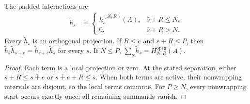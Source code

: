 \begin{lemma}
    \label{thm:open_knabe_padding_properties}
    \leanok
    The padded interactions are
    \begin{align}
        \widetilde h_s & =
        \begin{cases}
            h_{\bar s}^{(N,R)}(A), & \bar s+R\leq N, \\
            0,                     & \bar s+R>N.
        \end{cases}
        \label{eq:open_knabe_padding}
    \end{align}
    Every $\widetilde h_s$ is an orthogonal projection. If $R\leq e$ and
    $e+R\leq P$, then $\widetilde h_s\widetilde h_{s+e}
        =\widetilde h_{s+e}\widetilde h_s$ for every $s$. If $N\leq P$,
    $\sum_s\widetilde h_s=H^{\mathrm{open}}_{N,R}(A)$.
\end{lemma}
\begin{proof}\leanok
    Each term is a local projection or zero. At the stated separation,
    either $\bar s+R\leq\overline{s+e}$ or
    $\overline{s+e}+R\leq\bar s$. When both terms are active, their
    nonwrapping intervals are disjoint, so the local terms commute.
    For $P\geq N$, every nonwrapping start occurs exactly once; all
    remaining summands vanish.
\end{proof}

